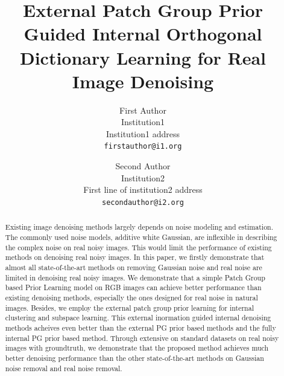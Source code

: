 \documentclass[10pt,twocolumn,letterpaper]{article}
\begin{document}
\title{External Patch Group Prior Guided Internal Orthogonal Dictionary Learning for Real Image Denoising}

\author{First Author\\
Institution1\\
Institution1 address\\
{\tt\small firstauthor@i1.org}
\and
Second Author\\
Institution2\\
First line of institution2 address\\
{\tt\small secondauthor@i2.org}
}

\maketitle


\begin{abstract}
Existing image denoising methods largely depends on noise modeling and estimation. The commonly used noise models, additive white Gaussian, are inflexible in describing the complex noise on real noisy images. This would limit the performance of existing methods on denoising real noisy images. In this paper, we firstly demonstrate that almost all state-of-the-art methods on removing Gaussian noise and real noise are limited in denoising real noisy images. We demonstrate that a simple Patch Group based Prior Learning model on RGB images can achieve better performance than existing denoising methods, especially the ones designed for real noise in natural images. Besides, we employ the external patch group prior learning for internal clustering and subspace learning. This external inormation guided internal denoising methods acheives even better than the external PG prior based methods and the fully internal PG prior based method. Through extensive on standard datasets on real noisy images with groundtruth, we demonstrate that the proposed method achieves much better denoising performance than the other state-of-the-art methods on Gaussian noise removal and real noise removal. 
\end{abstract}

\end{document}
